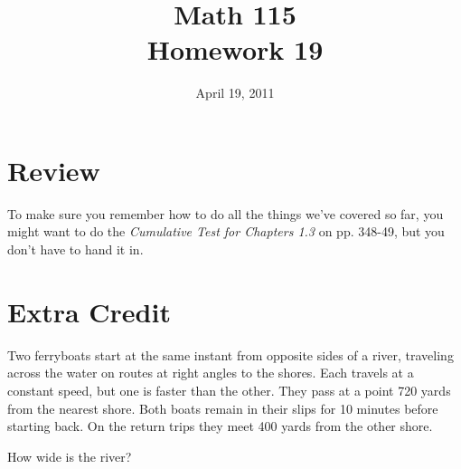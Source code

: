\documentclass[fleqn,addpoints]{exam}
\title{Math 115 \\ Homework 19}
\date{April 19, 2011}
\begin{document}
\maketitle


\ifprintanswers
\else
\section{Review}

To make sure you remember how to do all the things we've covered so far, you might want to do the {\em Cumulative Test
  for Chapters 1.3} on pp. 348-49, but you don't have to hand it in.  
\fi

\section{Extra Credit}

Two ferryboats start at the same instant from opposite sides of a river, traveling across the water on routes at right
angles to the shores.  Each travels at a constant speed, but one is faster than the other.  They pass at a point 720
yards from the nearest shore.  Both boats remain in their slips for 10 minutes before starting back.  On the return
trips they meet 400 yards from the other shore.

How wide is the river?
\end{document}
